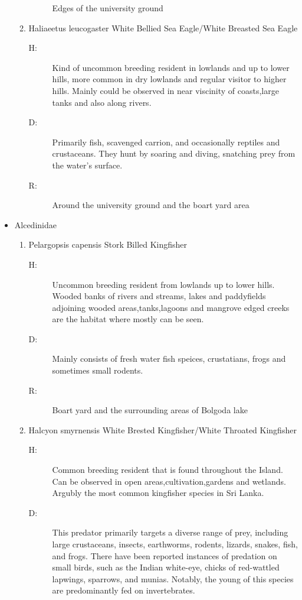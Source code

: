 \begin{itemize}
\begin{enumerate}
\begin{description}
Edges of the university ground%
\end{description}%
\item%
Haliaeetus leucogaster\newline%
White Bellied Sea Eagle/White Breasted Sea Eagle%
\begin{description}%
\item[H: ]%
Kind of uncommon breeding resident in lowlands and up to lower hills, more common in dry lowlands and regular visitor to higher hills. Mainly could be observed in near viscinity of coasts,large tanks and also along rivers.%
\item[D: ]%
Primarily fish, scavenged carrion, and occasionally reptiles and crustaceans. They hunt by soaring and diving, snatching prey from the water's surface.%
\item[R: ]%
Around the university ground and the boart yard area%
\end{description}%
\end{enumerate}%
\item%
Alcedinidae%
\begin{enumerate}%
\item%
Pelargopsis capensis\newline%
Stork Billed Kingfisher%
\begin{description}%
\item[H: ]%
Uncommon breeding resident from lowlands up to lower hills. Wooded banks of rivers and streams, lakes and paddyfields adjoining wooded areas,tanks,lagoons and mangrove edged creeks are the habitat where mostly can be seen. %
\item[D: ]%
Mainly consists of fresh water fish speices, crustatians, frogs and sometimes small rodents.%
\item[R: ]%
Boart yard and the surrounding areas of Bolgoda lake%
\end{description}%
\item%
Halcyon smyrnensis\newline%
White Brested Kingfisher/White Throated Kingfisher%
\begin{description}%
\item[H: ]%
Common breeding resident that is found throughout the Island. Can be observed in open areas,cultivation,gardens and wetlands. Argubly the most common kingfisher species in Sri Lanka.%
\item[D: ]%
This predator primarily targets a diverse range of prey, including large crustaceans, insects, earthworms, rodents, lizards, snakes, fish, and frogs. There have been reported instances of predation on small birds, such as the Indian white{-}eye, chicks of red{-}wattled lapwings, sparrows, and munias. Notably, the young of this species are predominantly fed on invertebrates.%

\end{description}
\end{enumerate}
\end{itemize}
